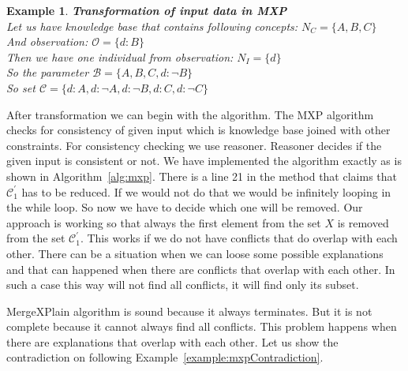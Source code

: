 \documentclass[12pt,a4paper]{article}
\newtheorem{example}{Example}[subsection]
\begin{document}
\begin{example}{\textbf{Transformation of input data in MXP}} \\
	\label{example:mxpTransform}
	\noindent Let us have knowledge base that contains following concepts: 
	$N_{C} = \{ A, B, C \}$ \\
	And observation: $\mathcal{O} = \{ d:B \}$ \\
	Then we have one individual from observation: $N_{I} = \{ d \} $ \\
	So the parameter $\mathcal{B} = \{ A,B,C, d: \neg B  \} $ \\
	So set $\mathcal{C} = \{ d:A, d:\neg A, d:\neg B, d:C, d:\neg C \}$
\end{example}

After transformation we can begin with the algorithm. The MXP algorithm checks for consistency of given input which is knowledge base joined with other constraints. For consistency checking we use reasoner. Reasoner decides if the given input is consistent or not. We have implemented the algorithm exactly as is shown in Algorithm~\ref{alg:mxp}.
There is a line 21 in the method  that claims that $\mathcal{C}^{\prime}_{1}$ has to be reduced. If we would not do that we would be infinitely looping in the while loop. So now we have to decide which one will be removed. Our approach is working so that always the first element from the set $X$ is removed from the set $\mathcal{C}^{\prime}_{1}$. This works if we do not have conflicts that do overlap with each other. There can be a situation when we can loose some possible explanations and that can happened when there are conflicts that overlap with each other. In such a case this way will not find all conflicts, it will find only its subset. 

MergeXPlain algorithm is sound because it always terminates. But it is not complete because it cannot always find all conflicts. This problem happens when there are explanations that  overlap with each other. Let us show the contradiction on following Example~\ref{example:mxpContradiction}.
\end{document}
